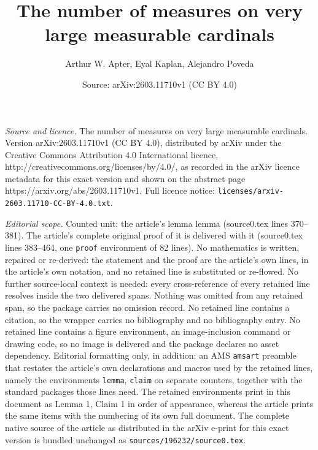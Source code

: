 \documentclass[10pt,a4paper]{amsart}
\title{The number of measures on very large measurable cardinals}
\author{Arthur W. Apter, Eyal Kaplan, Alejandro Poveda}
\date{Source: arXiv:2603.11710v1 (CC BY 4.0)}
\begin{document}
\maketitle

\noindent\emph{Source and licence.} The number of measures on very large measurable cardinals. Version arXiv:2603.11710v1 (CC BY 4.0), distributed by arXiv under the Creative Commons Attribution 4.0 International licence, http://creativecommons.org/licenses/by/4.0/, as recorded in the arXiv licence metadata for this exact version and shown on the abstract page https://arxiv.org/abs/2603.11710v1. Full licence notice: \texttt{licenses/arxiv-2603.11710-CC-BY-4.0.txt}.\par\smallskip

\noindent\textit{Editorial scope.} Counted unit: the article's lemma lemma (source0.tex lines 370--381). The article's complete original proof of it is delivered with it (source0.tex lines 383--464, one \texttt{proof} environment of 82 lines). No mathematics is written, repaired or re-derived: the statement and the proof are the article's own lines, in the article's own notation, and no retained line is substituted or re-flowed.  No further source-local context is needed: every cross-reference of every retained line resolves inside the two delivered spans.  Nothing was omitted from any retained span, so the package carries no omission record.  No retained line contains a citation, so the wrapper carries no bibliography and no bibliography entry.  No retained line contains a figure environment, an image-inclusion command or drawing code, so no image is delivered and the package declares no asset dependency.  Editorial formatting only, in addition: an AMS \texttt{amsart} preamble that restates the article's own declarations and macros used by the retained lines, namely the environments \texttt{lemma}, \texttt{claim} on separate counters, together with the standard packages those lines need.  The retained environments print in this document as Lemma 1, Claim 1 in order of appearance, whereas the article prints the same items with the numbering of its own full document.  The complete native source of the article as distributed in the arXiv e-print for this exact version is bundled unchanged as \texttt{sources/196232/source0.tex}.
\end{document}
